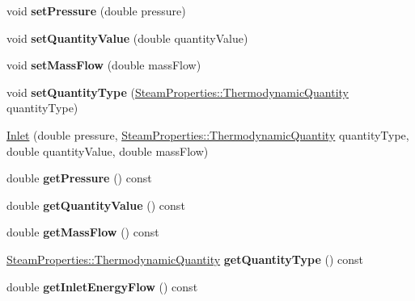 \begin{DoxyCompactItemize}
\mbox{\label{class_inlet_ad0d848976347160293c6576e005f090b}} 
void {\bfseries set\+Pressure} (double pressure)
\item 
\mbox{\label{class_inlet_a64a5567c35c89f82f5782bf7b83b90c3}} 
void {\bfseries set\+Quantity\+Value} (double quantity\+Value)
\item 
\mbox{\label{class_inlet_a1e427ac34eeebf46546ed53499359459}} 
void {\bfseries set\+Mass\+Flow} (double mass\+Flow)
\item 
\mbox{\label{class_inlet_a4171632101de3f4c97c93bb06c6b51e4}} 
void {\bfseries set\+Quantity\+Type} (\hyperlink{class_steam_properties_ae0294bedf7d178c2d8fb6aed0f62fbff}{Steam\+Properties\+::\+Thermodynamic\+Quantity} quantity\+Type)
\item 
\hyperlink{class_inlet_a1b0e1d27b8c7b11cfd96623b1c0b8a9e}{Inlet} (double pressure, \hyperlink{class_steam_properties_ae0294bedf7d178c2d8fb6aed0f62fbff}{Steam\+Properties\+::\+Thermodynamic\+Quantity} quantity\+Type, double quantity\+Value, double mass\+Flow)
\item 
\mbox{\label{class_inlet_af9bc455eb1287892901b7d090dabddfd}} 
double {\bfseries get\+Pressure} () const
\item 
\mbox{\label{class_inlet_ac9279e9c81b989b795351f09c4dd2b71}} 
double {\bfseries get\+Quantity\+Value} () const
\item 
\mbox{\label{class_inlet_af32941228d08175cb13d6f7757de39aa}} 
double {\bfseries get\+Mass\+Flow} () const
\item 
\mbox{\label{class_inlet_a3ed1699b174d0698af937c7146bbee79}} 
\hyperlink{class_steam_properties_ae0294bedf7d178c2d8fb6aed0f62fbff}{Steam\+Properties\+::\+Thermodynamic\+Quantity} {\bfseries get\+Quantity\+Type} () const
\item 
\mbox{\label{class_inlet_a870b939e6b0de093a42341e3fa22d75b}} 
double {\bfseries get\+Inlet\+Energy\+Flow} () const
\item 
\mbox{\label{class_inlet_a6f2f7f2569a5815c60c728d6930b59af}} 

\end{DoxyCompactItemize}
